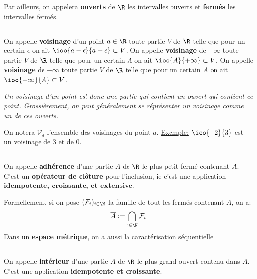 Par ailleurs, on appelera \textbf{ouverts} de \(\R\) les intervalles ouverts et \textbf{fermés} les intervalles fermés.

\subsection*{}
On appelle \textbf{voisinage} d'un point \(a \in \R\) toute partie \(V\) de \(\R\) telle que pour un certain \(\epsilon\) on ait \(\ioo{a - \epsilon}{a + \epsilon} \subset V\).\+
On appelle \textbf{voisinage} de \(+\infty\) toute partie \(V\) de \(\R\) telle que pour un certain \(A\) on ait \(\ioo{A}{+\infty} \subset V\).\+
On appelle \textbf{voisinage} de \(-\infty\) toute partie \(V\) de \(\R\) telle que pour un certain \(A\) on ait \(\ioo{-\infty}{A} \subset V\).\+
\begin{center}
   \textit{
      Un voisinage d'un point est donc une partie qui contient un ouvert qui contient ce point. Grossièrement, on peut généralement se réprésenter un voisinage comme un de ces ouverts.
   }
\end{center}
On notera \(\mathscr{V}_a\) l'ensemble des voisinages du point \(a\).\+
\underline{Exemple:} \(\ico{-2}{3}\) est un voisinage de \(3\) et de \(0\).

\subsection*{}
On appelle \textbf{adhérence} d'une partie \(A\) de \(\R\) le plus petit fermé contenant \(A\). C'est un \textbf{opérateur de clôture} pour l'inclusion, ie c'est une application \textbf{idempotente, croissante, et extensive}.\<

Formellement, si on pose \((\mathcal{F}_i)_{i \in \N}\) la famille de tout les fermés contenant \(A\), on a:
\[
    \overline{A} := \bigcap_{i \in \N} \mathcal{F}_i
\]
Dans un \textbf{espace métrique}, on a aussi la caractérisation séquentielle:

\subsection*{}
On appelle \textbf{intérieur} d'une partie \(A\) de \(\R\) le plus grand ouvert contenu dans \(A\). C'est une application \textbf{idempotente et croissante}.\<

